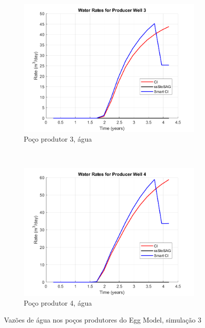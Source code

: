 \begin{figure}[!ht]
	\begin{subfigure}[b]{.45\textwidth}
		\includegraphics[width=\textwidth]{figs/resultadosEgg/imgsim3/EGG_WaterWell3_Zoom}
		\caption{Po\c{c}o produtor 3, \'{a}gua}
		\label{EGG3_WaterWell3}
	\end{subfigure}
	~
	\begin{subfigure}[b]{.45\textwidth}
		\includegraphics[width=\textwidth]{figs/resultadosEgg/imgsim3/EGG_WaterWell4_Zoom}
		\caption{Po\c{c}o produtor 4, \'{a}gua}
		\label{EGG3_WaterWell4}
	\end{subfigure}
	\caption{Vaz\~{o}es de \'{a}gua nos po\c{c}os produtores do Egg Model, simula\c{c}\~{a}o 3}
	\label{EGG3_WaterRates}
\end{figure}

